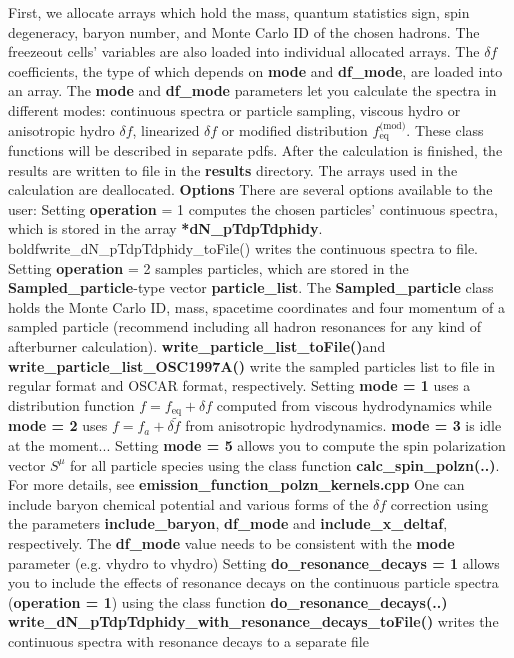 \documentclass[10.5pt,aps,prd,superscriptaddress]{revtex4}
\newcommand{\eq}{\text{eq}}
\newcommand{\nn}{\newline\newline}
\newcommand{\boldf}{\textbf}
\begin{document}
\nn 
First, we allocate arrays which hold the mass, quantum statistics sign, spin degeneracy, baryon number, and Monte Carlo ID of the chosen hadrons. The freezeout cells' variables are also loaded into individual allocated arrays. The $\delta f$ coefficients, the type of which depends on \boldf{mode} and \boldf{df\_mode}, are loaded into an array. 
\nn
The \boldf{mode} and \boldf{df\_mode} parameters let you calculate the spectra in different modes: continuous spectra or particle sampling, viscous hydro or anisotropic hydro $\delta f$, linearized $\delta f$ or modified distribution $f_\eq^{\text{(mod)}}$. These class functions will be described in separate pdfs.
\nn
After the calculation is finished, the results are written to file in the \boldf{results} directory. The arrays used in the calculation are deallocated.
\nn
\boldf{Options}
\nn
There are several options available to the user:
\nn
Setting \boldf{operation} = 1 computes the chosen particles' continuous spectra, which is stored in the array \boldf{*dN\_pTdpTdphidy}. boldf{write\_dN\_pTdpTdphidy\_toFile()} writes the continuous spectra to file.
\nn
Setting \boldf{operation} = 2  samples particles, which are stored in the \boldf{Sampled\_particle}-type vector \boldf{particle\_list}. The \boldf{Sampled\_particle} class holds the Monte Carlo ID, mass, spacetime coordinates and four momentum of a sampled particle (recommend including all hadron resonances for any kind of afterburner calculation). \boldf{write\_particle\_list\_toFile()}and \boldf{write\_particle\_list\_OSC1997A()} write the sampled particles list to file in regular format and OSCAR format, respectively. 
\nn
Setting \boldf{mode = 1} uses a distribution function $f = f_\eq + \delta f$ computed from viscous hydrodynamics while \boldf{mode = 2} uses $f = f_a + \delta\tilde f$ from anisotropic hydrodynamics. \boldf{mode = 3} is idle at the moment...
\nn
Setting \boldf{mode = 5} allows you to compute the spin polarization vector $S^\mu$ for all particle species using the class function \boldf{calc\_spin\_polzn(..)}. For more details, see \boldf{emission\_function\_polzn\_kernels.cpp}
\nn
One can include baryon chemical potential and various forms of the $\delta f$ correction using the parameters \boldf{include\_baryon}, \boldf{df\_mode} and \boldf{include\_x\_deltaf}, respectively. The \boldf{df\_mode} value needs to be consistent with the \boldf{mode} parameter (e.g. vhydro to vhydro)
\nn
Setting \boldf{do\_resonance\_decays = 1} allows you to include the effects of resonance decays on the continuous particle spectra (\boldf{operation = 1}) using the class function \boldf{do\_resonance\_decays(..)} \boldf{write\_dN\_pTdpTdphidy\_with\_resonance\_decays\_toFile()} writes the continuous spectra with resonance decays to a separate file
\nn
\end{document}
